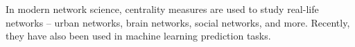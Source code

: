 \documentclass[preview]{standalone}
\begin{document}
In modern network science, centrality measures are used to study real-life networks -- urban networks, brain networks, social networks, and more. Recently, they have also been used in machine learning prediction tasks.\\
\end{document}
